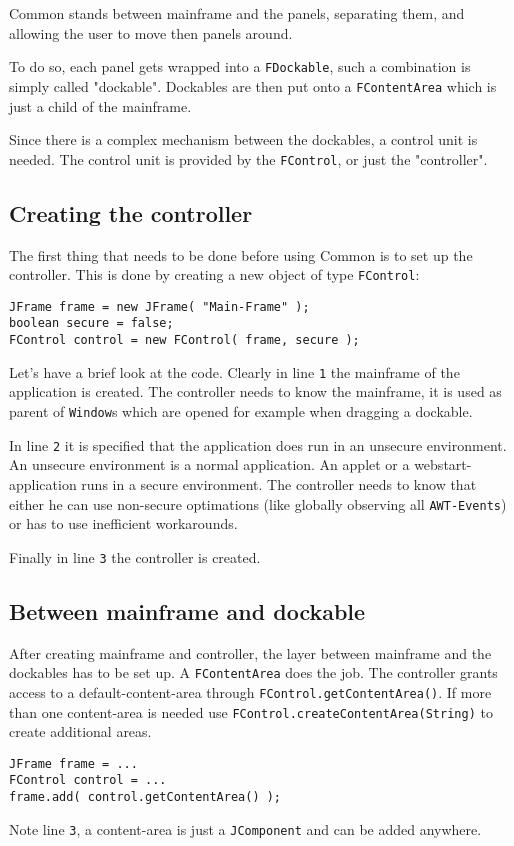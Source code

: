 \documentclass[a4paper,10pt]{article}
\newcommand{\src}[1]{\lstinline[basicstyle=\ttfamily]|#1|}
\begin{document}
Common stands between mainframe and the panels, separating them, and allowing the user to move then panels around.

To do so, each panel gets wrapped into a \src{FDockable}, such a combination is simply called "dockable". Dockables are then put onto a \src{FContentArea} which is just a child of the mainframe.

Since there is a complex mechanism between the dockables, a control unit is needed. The control unit is provided by the \src{FControl}, or just the "controller".

\subsection{Creating the controller}
The first thing that needs to be done before using Common is to set up the controller. This is done by creating a new object of type \src{FControl}:
\begin{lstlisting}
JFrame frame = new JFrame( "Main-Frame" );
boolean secure = false;
FControl control = new FControl( frame, secure );
\end{lstlisting}

Let's have a brief look at the code. Clearly in line \src{1} the mainframe of the application is created. The controller needs to know the mainframe, it is used as parent of \src{Window}s which are opened for example when dragging a dockable.

In line \src{2} it is specified that the application does run in an unsecure environment. An unsecure environment is a normal application. An applet or a webstart-application runs in a secure environment. The controller needs to know that either he can use non-secure optimations (like globally observing all \src{AWT-Events}) or has to use inefficient workarounds.

Finally in line \src{3} the controller is created.

\subsection{Between mainframe and dockable}
After creating mainframe and controller, the layer between mainframe and the dockables has to be set up. A \src{FContentArea} does the job. The controller grants access to a default-content-area through \src{FControl.getContentArea()}. If more than one content-area is needed use \src{FControl.createContentArea(String)} to create additional areas.
\begin{lstlisting}
JFrame frame = ...
FControl control = ...	
frame.add( control.getContentArea() );
\end{lstlisting}
Note line \src{3}, a content-area is just a \src{JComponent} and can be added anywhere.
\end{document}
